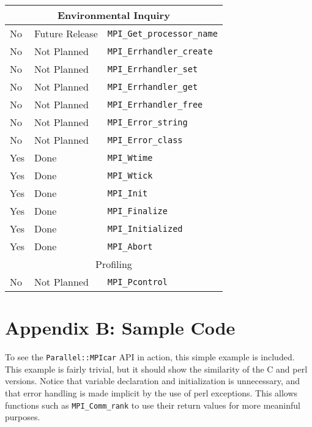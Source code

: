 \documentclass{report}
\begin{document}
\begin{tabular}{|l|l|l|}
\hline
\multicolumn{3}{|c|}{ Environmental Inquiry } \\ \hline

No             & Future Release     & \verb|MPI_Get_processor_name| \\ \hline
No             & Not Planned        & \verb|MPI_Errhandler_create| \\ \hline
No             & Not Planned        & \verb|MPI_Errhandler_set| \\ \hline
No             & Not Planned        & \verb|MPI_Errhandler_get| \\ \hline
No             & Not Planned        & \verb|MPI_Errhandler_free| \\ \hline
No             & Not Planned        & \verb|MPI_Error_string| \\ \hline
No             & Not Planned        & \verb|MPI_Error_class| \\ \hline
Yes            & Done               & \verb|MPI_Wtime| \\ \hline
Yes            & Done               & \verb|MPI_Wtick| \\ \hline
Yes            & Done               & \verb|MPI_Init| \\ \hline
Yes            & Done               & \verb|MPI_Finalize| \\ \hline
Yes            & Done               & \verb|MPI_Initialized| \\ \hline
Yes            & Done               & \verb|MPI_Abort| \\ \hline

\hline
\multicolumn{3}{|c|}{ Profiling } \\ \hline

No             & Not Planned        & \verb|MPI_Pcontrol| \\ \hline

\end{tabular}

\chapter*{Appendix B: Sample Code}

To see the \verb|Parallel::MPIcar| API in action, this simple example is
included.  This example is fairly trivial, but it should show the
similarity of the C and perl versions.   Notice that variable
declaration and initialization is unnecessary, and that error handling 
is made implicit by the use of perl exceptions.  This allows functions 
such as \verb|MPI_Comm_rank| to use their return values for more
meaninful purposes.
\end{document}
